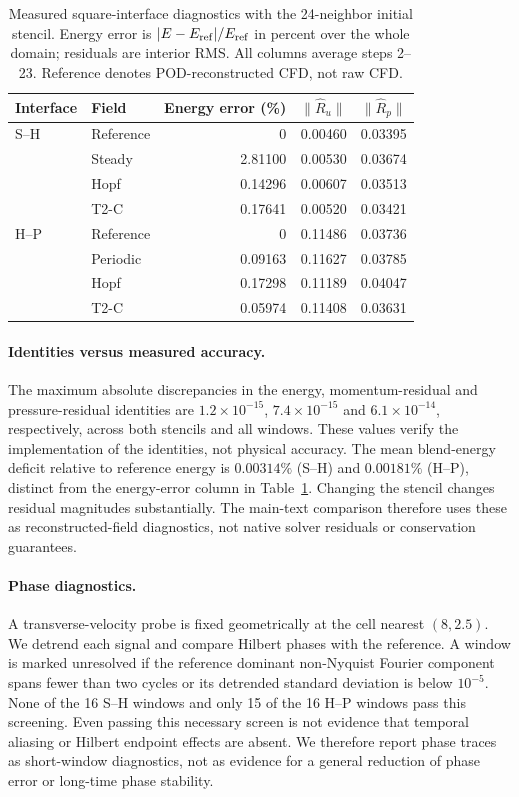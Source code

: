 \begin{table}[H]
\centering\small
\caption{Measured square-interface diagnostics with the 24-neighbor initial
stencil. Energy error is $|E-E_{\rm ref}|/E_{\rm ref}$ in percent over the
whole domain; residuals are interior RMS. All columns average steps 2--23.
Reference denotes POD-reconstructed CFD, not raw CFD.}
\label{tab:fusion_residual_measured}
\begin{tabular}{@{}llrrr@{}}
\toprule
Interface & Field & Energy error (\%) & $\|\widehat R_u\|$ & $\|\widehat R_p\|$\\
\midrule
S--H & Reference & 0 & 0.00460 & 0.03395\\
& Steady & 2.81100 & 0.00530 & 0.03674\\
& Hopf & 0.14296 & 0.00607 & 0.03513\\
& T2-C & 0.17641 & 0.00520 & 0.03421\\
\midrule
H--P & Reference & 0 & 0.11486 & 0.03736\\
& Periodic & 0.09163 & 0.11627 & 0.03785\\
& Hopf & 0.17298 & 0.11189 & 0.04047\\
& T2-C & 0.05974 & 0.11408 & 0.03631\\
\bottomrule
\end{tabular}
\end{table}

\paragraph{Identities versus measured accuracy.}
The maximum absolute discrepancies in the energy, momentum-residual and
pressure-residual identities are $1.2\times10^{-15}$,
$7.4\times10^{-15}$ and $6.1\times10^{-14}$, respectively, across both
stencils and all windows. These values verify the implementation of the
identities, not physical accuracy. The mean blend-energy deficit relative
to reference energy is $0.00314\%$ (S--H) and $0.00181\%$ (H--P), distinct
from the energy-error column in Table~\ref{tab:fusion_residual_measured}.
Changing the stencil changes residual magnitudes substantially.
The main-text comparison therefore uses these as reconstructed-field
diagnostics, not native solver residuals or conservation guarantees.

\paragraph{Phase diagnostics.}
A transverse-velocity probe is fixed geometrically at the cell nearest
$(8,2.5)$. We detrend each signal and compare Hilbert phases with the
reference. A window is marked unresolved if the reference dominant
non-Nyquist Fourier component spans fewer than two cycles or its detrended
standard deviation is below $10^{-5}$. None of the 16 S--H windows and only
15 of the 16 H--P windows pass this screening. Even passing this necessary
screen is not evidence that temporal aliasing or Hilbert endpoint effects
are absent. We therefore report phase traces as short-window diagnostics,
not as evidence for a general reduction of phase error or long-time
phase stability.

